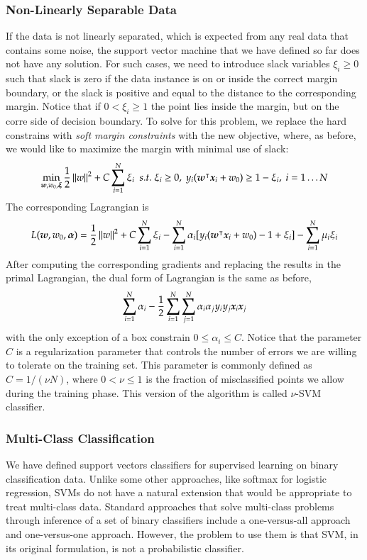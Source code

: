 \begin{refsection}
\subsubsection*{Non-Linearly Separable Data}

If the data is not linearly separated, which is expected from any real data that contains some noise, the support vector machine that we have defined so far does not have any solution. For such cases, we need to introduce slack variables $\xi_i\geq 0$ such that slack is zero if the data instance is on or inside the correct margin boundary, or the slack is positive and equal to the distance to the corresponding margin. Notice that if $0<\xi_i\geq 1$ the point lies inside the margin, but on the corre side of decision boundary. To solve for this problem, we replace the hard constrains with {\em soft margin constraints} with the new objective, where, as before, we would like to maximize the margin with minimal use of slack:
$$ \min_{\vect{w},w_0,\vect{\xi}} {1\over 2}\norm{w}^2+C\sum_{i=1}^N\xi_i\ \ s.t.\ \xi_i\geq 0,\ y_i(\vect{w}^\tr \vect{x}_i+w_0)\geq 1-\xi_i,\ i=1\ldots N$$
The corresponding Lagrangian is
$$ L(\boldsymbol{w},w_0,\boldsymbol{\alpha})={1\over 2}\left\lVert w\right\rVert^2 + C\sum_{i=1}^N\xi_i - \sum_{i=1}^N \alpha_i [y_i(\boldsymbol{w}^\intercal \boldsymbol{x}_i+w_0)-1+\xi_i] -\sum_{i=1}^N\mu_i\xi_i$$
After computing the corresponding gradients and replacing the results in the primal Lagrangian, the dual form of Lagrangian is the same as before,
$$ \sum_{i=1}^N \alpha_i - {1\over 2}\sum_{i=1}^N\sum_{j=1}^N \alpha_i\alpha_j y_i y_j \boldsymbol{x}_i\boldsymbol{x}_j $$
with the only exception of a box constrain $0\leq\alpha_i\leq C$. Notice that the parameter $C$ is a regularization parameter that controls the number of errors we are willing to tolerate on the training set. This parameter is commonly defined as $C=1/(\nu N)$, where $0<\nu\leq 1$ is the fraction of misclassified points we allow during the training phase. This version of the algorithm is called $\nu$-SVM classifier.

\subsubsection*{Multi-Class Classification}

We have defined support vectors classifiers for supervised learning on binary classification data. Unlike some other approaches, like softmax for logistic regression, SVMs do not have a natural extension that would be appropriate to treat multi-class data. Standard approaches that solve multi-class problems through inference of a set of binary classifiers include a one-versus-all approach and one-versus-one approach. However, the problem to use them is that SVM, in its original formulation, is not a probabilistic classifier.


\end{refsection}
